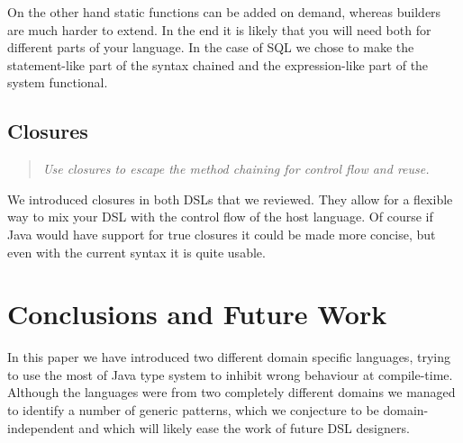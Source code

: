\documentclass{sig-alternate}
\begin{document}
On the other hand static functions can be added on demand, whereas builders are much harder to extend. In the end it is likely that you will need both for different parts of your language. In the case of SQL we chose to make the statement-like part of the syntax chained and the expression-like part of the system functional.

\subsection{Closures}

\begin{quote}
\emph{Use closures to escape the method chaining for control flow and reuse.}
\end{quote}

We introduced closures in both DSLs that we reviewed. They allow for a flexible way to mix your DSL with the control flow of the host language. Of course if Java would have support for true closures it could be made more concise, but even with the current syntax it is quite usable.



\section{Conclusions and Future Work}

In this paper we have introduced two different domain specific languages, trying to use the most of Java type system to inhibit wrong behaviour at compile-time. Although the languages were from two completely different domains we managed to identify a number of generic patterns, which we conjecture to be domain-independent and which will likely ease the work of future DSL designers.
\end{document}
